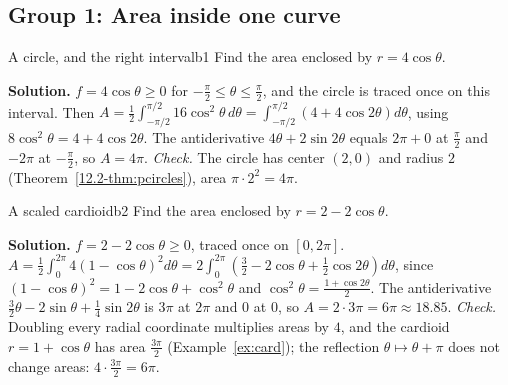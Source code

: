 \documentclass[11pt]{article}
\begin{document}
\subsection*{Group 1: Area inside one curve}

\begin{exmp}{A circle, and the right interval}{b1}
Find the area enclosed by $r=4\cos\theta$.

\textbf{Solution.} $f=4\cos\theta\ge0$ for $-\frac\pi2\le\theta\le\frac\pi2$, and the circle is traced once on this interval. Then $A=\frac12\int_{-\pi/2}^{\pi/2}16\cos^2\theta\,d\theta=\int_{-\pi/2}^{\pi/2}\left(4+4\cos2\theta\right)d\theta$, using $8\cos^2\theta=4+4\cos2\theta$. The antiderivative $4\theta+2\sin2\theta$ equals $2\pi+0$ at $\frac\pi2$ and $-2\pi$ at $-\frac\pi2$, so $A=4\pi$. \emph{Check.} The circle has center $(2,0)$ and radius $2$ (Theorem~\ref{12.2-thm:pcircles}), area $\pi\cdot2^2=4\pi$.
\end{exmp}

\begin{exmp}{A scaled cardioid}{b2}
Find the area enclosed by $r=2-2\cos\theta$.

\textbf{Solution.} $f=2-2\cos\theta\ge0$, traced once on $[0,2\pi]$. $A=\frac12\int_0^{2\pi}4(1-\cos\theta)^2d\theta=2\int_0^{2\pi}\left(\frac32-2\cos\theta+\frac12\cos2\theta\right)d\theta$, since $(1-\cos\theta)^2=1-2\cos\theta+\cos^2\theta$ and $\cos^2\theta=\frac{1+\cos2\theta}2$. The antiderivative $\frac32\theta-2\sin\theta+\frac14\sin2\theta$ is $3\pi$ at $2\pi$ and $0$ at $0$, so $A=2\cdot3\pi=6\pi\approx18.85$. \emph{Check.} Doubling every radial coordinate multiplies areas by $4$, and the cardioid $r=1+\cos\theta$ has area $\frac{3\pi}2$ (Example~\ref{ex:card}); the reflection $\theta\mapsto\theta+\pi$ does not change areas: $4\cdot\frac{3\pi}2=6\pi$.
\end{exmp}
\end{document}
